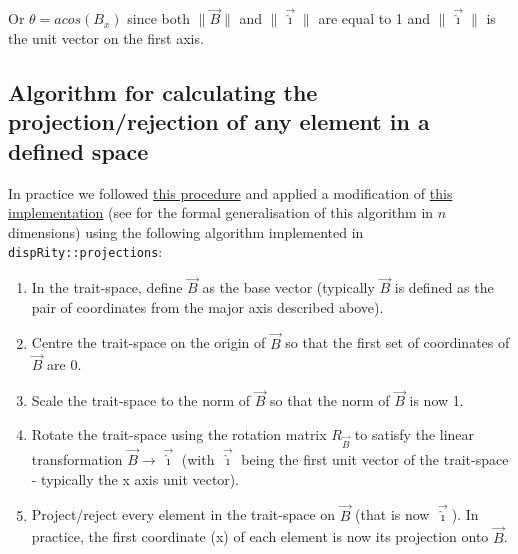 \documentclass[12pt,letterpaper]{article}
\begin{document}
Or $\theta = acos (B_x)$ since both $\|\vec{B}\|$ and $\|\vec{\hat{\imath}}\|$ are equal to 1 and $\|\vec{\hat{\imath}}\|$ is the unit vector on the first axis.

\subsection{Algorithm for calculating the projection/rejection of any element in a defined space}

In practice we followed \href{https://math.stackexchange.com/questions/598750/finding-the-rotation-matrix-in-n-dimensions}{this procedure} and applied a modification of \href{https://stackoverflow.com/questions/42520301/find-rotation-matrix-of-one-vector-to-another-using-r/42542385#42542385}{this implementation} (see \cite{aguilera2004} for the formal generalisation of this algorithm in $n$ dimensions) using the following algorithm implemented in \texttt{dispRity::projections}:

\begin{enumerate}
 \item In the trait-space, define $\vec{B}$ as the base vector (typically $\vec{B}$ is defined as the pair of coordinates from the major axis described above).
 \item Centre the trait-space on the origin of $\vec{B}$ so that the first set of coordinates of $\vec{B}$ are 0.
 \item Scale the trait-space to the norm of $\vec{B}$ so that the norm of $\vec{B}$ is now 1.
 \item Rotate the trait-space using the rotation matrix $R_{\vec{B}}$ to satisfy the linear transformation $\vec{B} \rightarrow \vec{\hat{\imath}}$ (with $\vec{\hat{\imath}}$ being the first unit vector of the trait-space - typically the x axis unit vector). 
 \item Project/reject every element in the trait-space on $\vec{B}$ (that is now $\vec{\hat{\imath}}$). In practice, the first coordinate (x) of each element is now its projection onto $\vec{B}$.
\end{enumerate}






\end{document}
